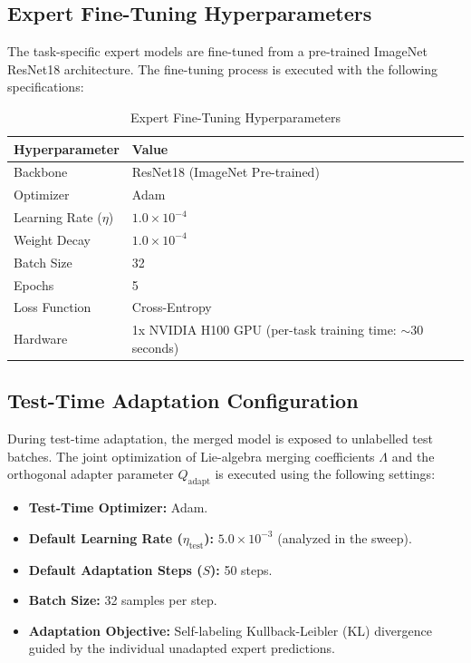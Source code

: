 \documentclass{article}
\theoremstyle{plain}
\theoremstyle{definition}
\theoremstyle{remark}
\begin{document}
\subsection{Expert Fine-Tuning Hyperparameters}
The task-specific expert models are fine-tuned from a pre-trained ImageNet ResNet18 architecture. The fine-tuning process is executed with the following specifications:
\begin{table}[h]
\caption{Expert Fine-Tuning Hyperparameters}
\label{tab:finetune_hyper}
\vskip 0.1in
\begin{center}
\begin{small}
\begin{tabular}{ll}
\toprule
Hyperparameter & Value \\
\midrule
Backbone & ResNet18 (ImageNet Pre-trained) \\
Optimizer & Adam \\
Learning Rate ($\eta$) & $1.0 \times 10^{-4}$ \\
Weight Decay & $1.0 \times 10^{-4}$ \\
Batch Size & 32 \\
Epochs & 5 \\
Loss Function & Cross-Entropy \\
Hardware & 1x NVIDIA H100 GPU (per-task training time: $\sim$30 seconds) \\
\bottomrule
\end{tabular}
\end{small}
\end{center}
\end{table}

\subsection{Test-Time Adaptation Configuration}
During test-time adaptation, the merged model is exposed to unlabelled test batches. The joint optimization of Lie-algebra merging coefficients $\Lambda$ and the orthogonal adapter parameter $Q_{\text{adapt}}$ is executed using the following settings:
\begin{itemize}
    \item \textbf{Test-Time Optimizer:} Adam.
    \item \textbf{Default Learning Rate ($\eta_{\text{test}}$):} $5.0 \times 10^{-3}$ (analyzed in the sweep).
    \item \textbf{Default Adaptation Steps ($S$):} 50 steps.
    \item \textbf{Batch Size:} 32 samples per step.
    \item \textbf{Adaptation Objective:} Self-labeling Kullback-Leibler (KL) divergence guided by the individual unadapted expert predictions.
\end{itemize}
\end{document}
